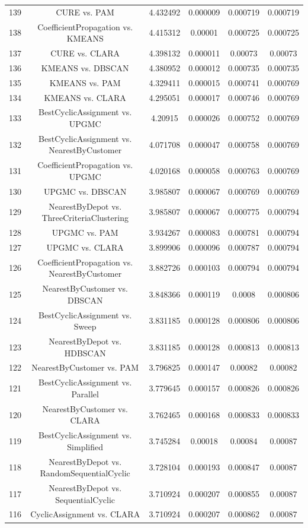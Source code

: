 \documentclass[a4paper,10pt]{article}
\begin{document}
\begin{landscape}
\begin{table}[!htp]
\begin{tabular}{cccccc}
139&CURE vs. PAM&4.432492&0.000009&0.000719&0.000719\\
138&CoefficientPropagation vs. KMEANS&4.415312&0.00001&0.000725&0.000725\\
137&CURE vs. CLARA&4.398132&0.000011&0.00073&0.00073\\
136&KMEANS vs. DBSCAN&4.380952&0.000012&0.000735&0.000735\\
135&KMEANS vs. PAM&4.329411&0.000015&0.000741&0.000769\\
134&KMEANS vs. CLARA&4.295051&0.000017&0.000746&0.000769\\
133&BestCyclicAssignment vs. UPGMC&4.20915&0.000026&0.000752&0.000769\\
132&BestCyclicAssignment vs. NearestByCustomer&4.071708&0.000047&0.000758&0.000769\\
131&CoefficientPropagation vs. UPGMC&4.020168&0.000058&0.000763&0.000769\\
130&UPGMC vs. DBSCAN&3.985807&0.000067&0.000769&0.000769\\
129&NearestByDepot vs. ThreeCriteriaClustering&3.985807&0.000067&0.000775&0.000794\\
128&UPGMC vs. PAM&3.934267&0.000083&0.000781&0.000794\\
127&UPGMC vs. CLARA&3.899906&0.000096&0.000787&0.000794\\
126&CoefficientPropagation vs. NearestByCustomer&3.882726&0.000103&0.000794&0.000794\\
125&NearestByCustomer vs. DBSCAN&3.848366&0.000119&0.0008&0.000806\\
124&BestCyclicAssignment vs. Sweep&3.831185&0.000128&0.000806&0.000806\\
123&NearestByDepot vs. HDBSCAN&3.831185&0.000128&0.000813&0.000813\\
122&NearestByCustomer vs. PAM&3.796825&0.000147&0.00082&0.00082\\
121&BestCyclicAssignment vs. Parallel&3.779645&0.000157&0.000826&0.000826\\
120&NearestByCustomer vs. CLARA&3.762465&0.000168&0.000833&0.000833\\
119&BestCyclicAssignment vs. Simplified&3.745284&0.00018&0.00084&0.00087\\
118&NearestByDepot vs. RandomSequentialCyclic&3.728104&0.000193&0.000847&0.00087\\
117&NearestByDepot vs. SequentialCyclic&3.710924&0.000207&0.000855&0.00087\\
116&CyclicAssignment vs. CLARA&3.710924&0.000207&0.000862&0.00087\\

\end{tabular}
\end{table}
\end{landscape}
\end{document}
